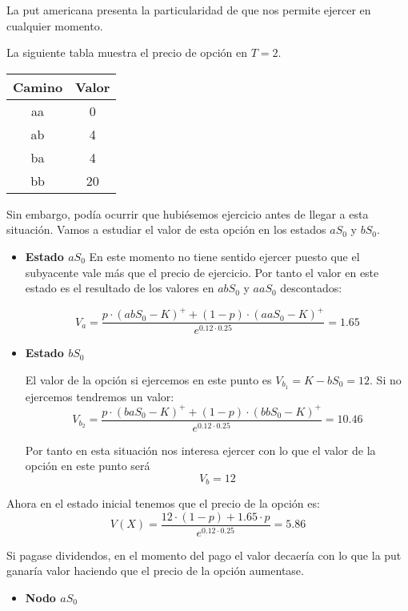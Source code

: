 \begin{problem}[2]
La put americana presenta la particularidad de que nos permite ejercer en cualquier momento.

La siguiente tabla muestra el precio de opción en $T=2$.

\begin{center}
\begin{tabular}{|c|c|}
\hline
\textbf{Camino} & \textbf{Valor}\\
\hline
aa & 0 \\
ab & 4 \\
ba & 4 \\
bb & 20 \\
\hline
\end{tabular}
\end{center}

Sin embargo, podía ocurrir que hubiésemos ejercicio antes de llegar a esta situación. Vamos a estudiar el valor de esta opción en los estados $aS_0$ y $bS_0$.

\begin{itemize}
\item \textbf{Estado $aS_0$}
En este momento no tiene sentido ejercer puesto que el subyacente vale más que el precio de ejercicio. Por tanto el valor en este estado es el resultado de los valores en $abS_0$ y $aaS_0$ descontados:

\[V_{a} = \frac{p\cdot (abS_0-K)^+ + (1-p)\cdot (aaS_0-K)^+}{e^{0.12\cdot 0.25}}=1.65\]

\item \textbf{Estado $bS_0$}

El valor de la opción si ejercemos en este punto es $V_{b_1} = K-bS_0=12$. Si no ejercemos tendremos un valor:
\[V_{b_2} = \frac{p\cdot (baS_0-K)^+ + (1-p)\cdot (bbS_0-K)^+}{e^{0.12\cdot 0.25}} = 10.46\]

Por tanto en esta situación nos interesa ejercer con lo que el valor de la opción en este punto será
\[V_b = 12\]
\end{itemize}

Ahora en el estado inicial tenemos que el precio de la opción es:
\[V(X) = \frac{12\cdot (1-p) + 1.65\cdot p}{e^{0.12\cdot 0.25}} = 5.86\]

\spart Si pagase dividendos, en el momento del pago el valor decaería con lo que la put ganaría valor haciendo que el precio de la opción aumentase.

\spart

\begin{itemize}
\item \textbf{Nodo $aS_0$}


\end{itemize}
\end{problem}

